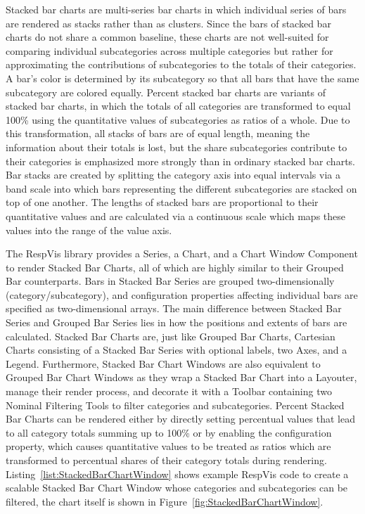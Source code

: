 Stacked bar charts are multi-series bar charts in which individual
series of bars are rendered as stacks rather than as clusters. Since
the bars of stacked bar charts do not share a common baseline, these
charts are not well-suited for comparing individual subcategories
across multiple categories but rather for approximating the
contributions of subcategories to the totals of their categories. A
bar's color is determined by its subcategory so that all bars that
have the same subcategory are colored equally. Percent stacked bar
charts are variants of stacked bar charts, in which the totals of all
categories are transformed to equal 100\% using the quantitative
values of subcategories as ratios of a whole. Due to this
transformation, all stacks of bars are of equal length, meaning the
information about their totals is lost, but the share subcategories
contribute to their categories is emphasized more strongly than in
ordinary stacked bar charts. Bar stacks are created by splitting the
category axis into equal intervals via a band scale into which bars
representing the different subcategories are stacked on top of one
another. The lengths of stacked bars are proportional to their
quantitative values and are calculated via a continuous scale which
maps these values into the range of the value axis.


The RespVis library provides a Series, a Chart, and a Chart Window
Component to render Stacked Bar Charts, all of which are highly
similar to their Grouped Bar counterparts. Bars in Stacked Bar Series
are grouped two-dimensionally (category/subcategory), and
configuration properties affecting individual bars are specified as
two-dimensional arrays. The main difference between Stacked Bar Series
and Grouped Bar Series lies in how the positions and extents of bars
are calculated. Stacked Bar Charts are, just like Grouped Bar Charts,
Cartesian Charts consisting of a Stacked Bar Series with optional
labels, two Axes, and a Legend. Furthermore, Stacked Bar Chart Windows
are also equivalent to Grouped Bar Chart Windows as they wrap a
Stacked Bar Chart into a Layouter, manage their render process, and
decorate it with a Toolbar containing two Nominal Filtering Tools to
filter categories and subcategories. Percent Stacked Bar Charts can be
rendered either by directly setting percentual values that lead to all
category totals summing up to 100\% or by enabling the
 configuration property, which causes
quantitative values to be treated as ratios which are transformed to
percentual shares of their category totals during rendering.
Listing~\ref{list:StackedBarChartWindow} shows example RespVis
code to create a scalable Stacked Bar Chart Window whose categories
and subcategories can be filtered, the chart itself is shown in
Figure~\ref{fig:StackedBarChartWindow}.
 

